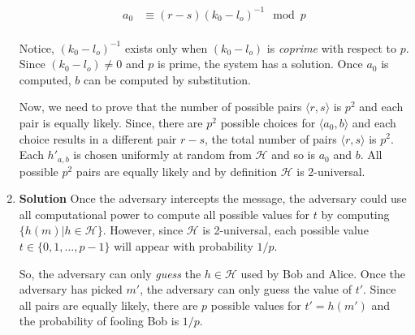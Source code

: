 \documentclass[12pt, a4paper]{article} %
\newcommand\angles[1]{\langle #1 \rangle}
\begin{document}
\begin{enumerate}[label=(\alph*)]
    \begin{align*}
      a_{0} &\equiv (r - s)(k_{0} - l_{o})^{-1} \mod p\\
    \end{align*}

    Notice, $(k_{0} - l_{o})^{-1}$ exists only when $(k_{0} - l_{o})$ is \textit{coprime} with respect to $p$. Since $(k_{0} - l_{o}) \neq 0$ and $p$ is prime, the system has a solution. Once $a_{0}$ is computed, $b$ can be computed by substitution.

    Now, we need to prove that the number of possible pairs $\angles{r, s}$ is $p^{2}$ and each pair is equally likely. Since, there are $p^{2}$ possible choices for $\angles{a_{0}, b}$ and each choice results in a different pair $r - s$, the total number of pairs $\angles{r, s}$ is $p^{2}$. Each $h'_{a,b}$ is chosen uniformly at random from $\mathcal{H}$ and so is $a_{0}$ and $b$. All possible $p^{2}$ pairs are equally likely and by definition $\mathcal{H}$ is 2-universal.

  \item

    \textbf{Solution} Once the adversary intercepts the message, the adversary could use all computational power to compute all possible values for $t$ by computing $\{h(m) | h \in \mathcal{H}\}$. However, since $\mathcal{H}$ is 2-universal, each possible value $t \in \{0, 1, \ldots, p - 1\}$ will appear with probability $1/p$.

    So, the adversary can only \textit{guess} the $h \in \mathcal{H}$ used by Bob and Alice.
    Once the adversary has picked $m'$, the adversary can only guess the value of $t'$. Since all pairs are equally likely, there are $p$ possible values for $t' = h(m')$ and the probability of fooling Bob is $1/p$.
\end{enumerate}


% 
\end{document}
